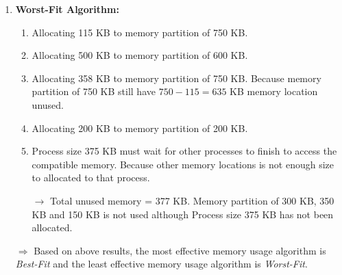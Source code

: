 \documentclass[13pt,a4paper]{article}
\begin{document}
\begin{enumerate}[$\ast$]
\begin{enumerate}[-]
				\end{enumerate}
			\item \textbf{Worst-Fit Algorithm:}
				\begin{enumerate}[-]
					\item Allocating 115 KB to memory partition of 750 KB.
					\item Allocating 500 KB to memory partition of 600 KB.
					\item Allocating 358 KB to memory partition of 750 KB. Because memory partition of 750 KB still have $750 - 115 = 635$ KB memory location unused.
					\item Allocating 200 KB to memory partition of 200 KB.
					\item Process size 375 KB must wait for other processes to finish to access the compatible memory. Because other memory locations is not enough size  to allocated to that process. 
					\item[$\rightarrow$] Total unused memory = 377 KB. Memory partition of 300 KB, 350 KB and 150 KB is not used although Process size 375 KB has not been allocated.
				\end{enumerate}
			\item[$\Rightarrow$] Based on above results, the most effective memory usage algorithm is \textit{Best-Fit} and the least effective memory usage algorithm is \textit{Worst-Fit}.
		\end{enumerate}
\end{document}
